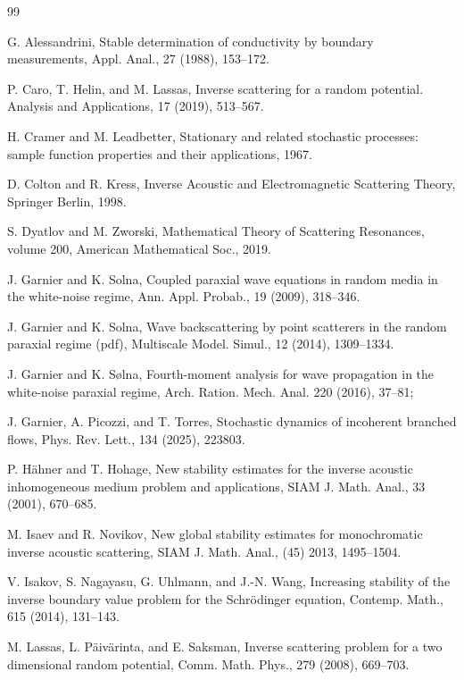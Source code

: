 \documentclass[reqno, 12pt]{amsart}
\numberwithin{equation}{section}
\begin{document}
\begin{thebibliography}{99}

G. Alessandrini, Stable determination of conductivity by boundary measurements,
Appl. Anal., 27 (1988), 153--172.



P. Caro, T. Helin, and M. Lassas, Inverse scattering for a random potential. Analysis and Applications, 17 (2019), 513--567.

H. Cramer and M. Leadbetter, Stationary and related stochastic processes: sample function properties
and their applications, 1967.

D. Colton and R. Kress, Inverse Acoustic and Electromagnetic Scattering Theory, 
Springer Berlin, 1998.

S. Dyatlov and M. Zworski, Mathematical Theory of Scattering Resonances, volume 200, American
Mathematical Soc., 2019.

J. Garnier and K. Solna, Coupled paraxial wave equations in random media in the white-noise regime, Ann. Appl. Probab., 19 (2009), 318--346.

J. Garnier and K. Solna, Wave backscattering by point scatterers in the random paraxial regime (pdf), Multiscale Model. Simul., 12 (2014), 1309--1334.

J. Garnier and K. S\o lna, Fourth-moment analysis for wave propagation in the white-noise paraxial regime, Arch. Ration. Mech. Anal. 220 (2016), 37--81; 

J. Garnier, A. Picozzi, and T. Torres, Stochastic dynamics of incoherent branched flows, Phys. Rev. Lett., 134 (2025), 223803.

P. H\"ahner and T. Hohage, New stability estimates for the inverse acoustic inhomogeneous
medium problem and applications, SIAM J. Math. Anal., 33 (2001), 670--685.



M. Isaev and R. Novikov, New global stability estimates for monochromatic inverse acoustic scattering, 
SIAM J. Math. Anal., (45) 2013, 1495--1504.

V. Isakov, S. Nagayasu, G. Uhlmann, and J.-N. Wang, Increasing stability of the inverse boundary
value problem for the Schr\"odinger equation, Contemp. Math., 615 (2014), 131--143.


M. Lassas, L. P{\"a}iv{\"a}rinta, and E. Saksman,
Inverse scattering problem for a two dimensional random potential,
Comm. Math. Phys., 279 (2008), 669--703.


\end{thebibliography}
\end{document}
